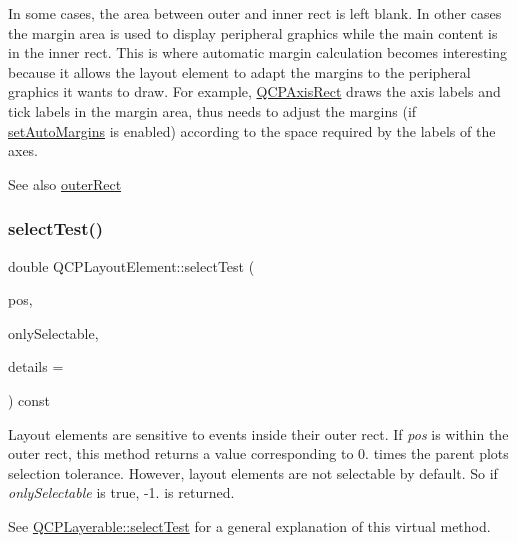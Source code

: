 In some cases, the area between outer and inner rect is left blank. In other cases the margin area is used to display peripheral graphics while the main content is in the inner rect. This is where automatic margin calculation becomes interesting because it allows the layout element to adapt the margins to the peripheral graphics it wants to draw. For example, \mbox{\hyperlink{class_q_c_p_axis_rect}{Q\+C\+P\+Axis\+Rect}} draws the axis labels and tick labels in the margin area, thus needs to adjust the margins (if \mbox{\hyperlink{class_q_c_p_layout_element_accfda49994e3e6d51ed14504abf9d27d}{set\+Auto\+Margins}} is enabled) according to the space required by the labels of the axes.

\begin{DoxySeeAlso}{See also}
\mbox{\hyperlink{class_q_c_p_layout_element_a2a32a12a6161c9dffbadeb9cc585510c}{outer\+Rect}} 
\end{DoxySeeAlso}
\mbox{\label{class_q_c_p_layout_element_ae97f483cccedadbf18ea4525ef240ee4}} 
\subsubsection{\texorpdfstring{selectTest()}{selectTest()}}
{\footnotesize\ttfamily double Q\+C\+P\+Layout\+Element\+::select\+Test (\begin{DoxyParamCaption}\item[{const Q\+PointF \&}]{pos,  }\item[{bool}]{only\+Selectable,  }\item[{Q\+Variant $\ast$}]{details = {} }\end{DoxyParamCaption}) const\hspace{0.3cm}{\ttfamily [virtual]}}

Layout elements are sensitive to events inside their outer rect. If {\itshape pos} is within the outer rect, this method returns a value corresponding to 0. times the parent plot\textquotesingle{}s selection tolerance. However, layout elements are not selectable by default. So if {\itshape only\+Selectable} is true, -\/1. is returned.

See \mbox{\hyperlink{class_q_c_p_layerable_a04db8351fefd44cfdb77958e75c6288e}{Q\+C\+P\+Layerable\+::select\+Test}} for a general explanation of this virtual method.

